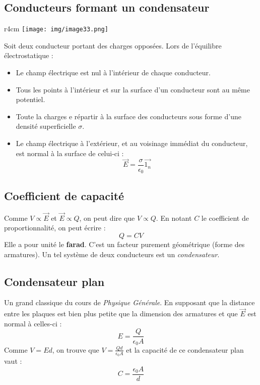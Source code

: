 \documentclass	[11pt, a4paper, openany]{book}
\begin{document}
\subsection{Conducteurs formant un condensateur}
\begin{wrapfigure}[12]{r}{4cm}
\texttt{[image: img/image33.png]}
\end{wrapfigure}
Soit deux conducteur portant des charges opposées. Lors de l'équilibre électrostatique :
\begin{itemize}
\item Le champ électrique est nul à l'intérieur de chaque conducteur.
\item Tous les points à l'intérieur et sur la surface d'un conducteur sont au même potentiel.
\item Toute la charges e répartir à la surface des conducteurs sous forme d'une densité superficielle $\sigma$.
\item Le champ électrique à l'extérieur, et au voisinage immédiat du conducteur, est normal à la surface de celui-ci :
\begin{equation}
\vec{E} = \frac{\sigma}{\epsilon_0}\vec{1_n}
\end{equation}
\end{itemize}
\subsection{Coefficient de capacité}
Comme $V \propto \vec{E}$ et $\vec{E} \propto Q$, on peut dire que $V \propto Q$. En notant $C$ le coefficient de proportionnalité, on peut écrire : 
\begin{equation}
Q = CV
\end{equation}
Elle a pour unité le \textbf{farad}. C'est un facteur purement géométrique (forme des armatures). Un tel système de deux conducteurs est un \textit{condensateur}.


\subsection{Condensateur plan}
Un grand classique du cours de \textit{Physique Générale}. En supposant que la distance entre les plaques est bien plus petite que la dimension des armatures et que $\vec{E}$ est normal à celles-ci :
\begin{equation}
E = \frac{Q}{\epsilon_0A}
\end{equation}
Comme $V = Ed$, on trouve que $V = \frac{Qd}{\epsilon_0 A}$ et la capacité de ce condensateur plan vaut :
\begin{equation}
C = \frac{\epsilon_0A}{d}
\end{equation}
\end{document}
